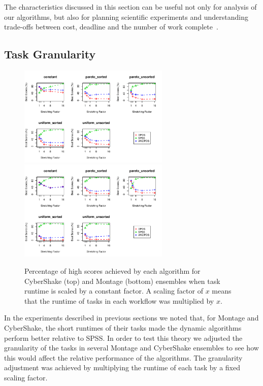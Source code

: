 \documentclass[preprint,5p]{elsarticle}
\begin{document}
The characteristics discussed in this section can be useful not only for
analysis of our algorithms, but also for planning scientific experiments and
understanding trade-offs between cost, deadline and the number of work
complete~\cite{Malawski-FGCS-13}.





\subsection{Task Granularity}
\label{sec:granularity}

\begin{figure}[htb]
    \centering
    \includegraphics[width=0.64\textwidth]{run-stretching-test-output-scaling-CYBERSHAKE}
    \includegraphics[width=0.64\textwidth]{run-stretching-test-output-scaling-MONTAGE}
    \caption{Percentage of high scores achieved by each algorithm for CyberShake (top)
    and Montage (bottom) ensembles when task runtime is scaled by a constant factor. A
    scaling factor of $x$ means that the runtime of tasks in each workflow was
    multiplied by $x$.}
    \label{fig:stretching}
\end{figure}



In the experiments described in previous sections we noted that, for Montage and
CyberShake, the short runtimes of their tasks made the dynamic algorithms
perform better relative to SPSS. In order to test this theory we adjusted the
granularity of the tasks in several Montage and CyberShake ensembles to see how
this would affect the relative performance of the algorithms. The granularity
adjustment was achieved by multiplying the runtime of each task by a fixed
scaling factor.
\end{document}
